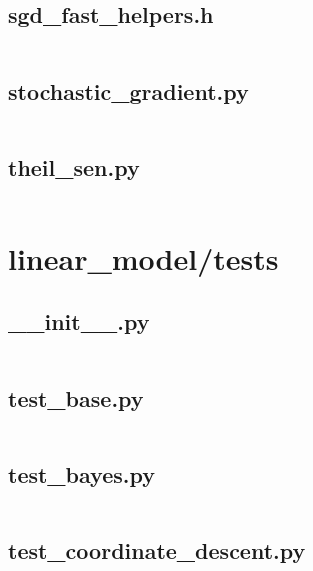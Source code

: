 \documentclass{article}
\begin{document}
\subsection{sgd\_fast\_helpers.h}
\inputminted{c}{/home/dufferzafar/dev/@clones/scikit-learn/sklearn/linear_model/sgd_fast_helpers.h}
\newpage

\subsection{stochastic\_gradient.py}
\inputminted{python}{/home/dufferzafar/dev/@clones/scikit-learn/sklearn/linear_model/stochastic_gradient.py}
\newpage

\subsection{theil\_sen.py}
\inputminted{python}{/home/dufferzafar/dev/@clones/scikit-learn/sklearn/linear_model/theil_sen.py}
\newpage

\section{linear\_model/tests}

\subsection{\_\_init\_\_.py}
\inputminted{python}{/home/dufferzafar/dev/@clones/scikit-learn/sklearn/linear_model/tests/__init__.py}
\newpage

\subsection{test\_base.py}
\inputminted{python}{/home/dufferzafar/dev/@clones/scikit-learn/sklearn/linear_model/tests/test_base.py}
\newpage

\subsection{test\_bayes.py}
\inputminted{python}{/home/dufferzafar/dev/@clones/scikit-learn/sklearn/linear_model/tests/test_bayes.py}
\newpage

\subsection{test\_coordinate\_descent.py}
\inputminted{python}{/home/dufferzafar/dev/@clones/scikit-learn/sklearn/linear_model/tests/test_coordinate_descent.py}
\newpage
\end{document}
